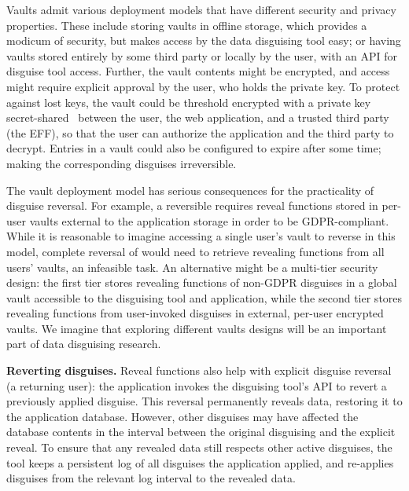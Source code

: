 %
Vaults admit various deployment models that have different security and privacy
properties.
%
%
These include storing vaults in offline storage, which provides a modicum of security,
but makes access by the data disguising tool easy; or having vaults stored entirely by
some third party or locally by the user, with an API for disguise tool access.
%
Further, the vault contents might be encrypted, and access might require explicit approval
by the user, who holds the private key.
%
To protect against lost keys, the vault could be threshold encrypted with a private key
secret-shared~\cite{secretsharing} between the user, the web application, and a trusted third party
(\eg the EFF), so that the user can authorize the application and the third party to decrypt.
%
Entries in a vault could also be configured to expire after some time; making the
corresponding disguises irreversible.
%

%
The vault deployment model has serious consequences for the practicality of disguise
reversal.
%
For example, a reversible \gdpr requires reveal functions stored in per-user vaults
external to the application storage in order to be GDPR-compliant.
%
While it is reasonable to imagine accessing a single user's vault to reverse \gdpr in
this model, complete reversal of \ca would need to retrieve revealing functions from
all users' vaults, an infeasible task.
%
An alternative might be a multi-tier security design: the first tier stores revealing
functions of non-GDPR disguises in a global vault accessible to the disguising tool
and application, while the second tier stores revealing functions from user-invoked
disguises in external, per-user encrypted vaults.
%
We imagine that exploring different vaults designs will be an important part of
data disguising research.
%

\textbf{Reverting disguises.}
%
Reveal functions also help with explicit disguise reversal (\eg a returning user): the
application invokes the disguising tool's API to revert a previously applied disguise.
%
This reversal permanently reveals data, restoring it to the application database.
%
However, other disguises may have affected the database contents in the interval between
the original disguising and the explicit reveal.
%
To ensure that any revealed data still respects other active disguises, the tool keeps
a persistent log of all disguises the application applied, and re-applies disguises from
the relevant log interval to the revealed data.
%

